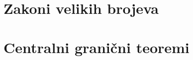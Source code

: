 \documentclass[a4paper,twoside,12pt]{report}
\begin{document}
    


    


    


    \part{Zakoni velikih brojeva}



    


    


    


    


    

    \part{Centralni grani\v cni teoremi}


    


    
    
\end{document}
